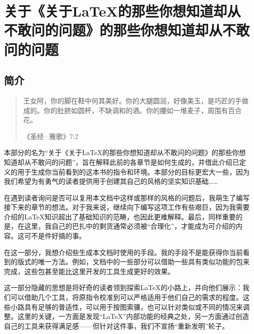 \part{关于《关于\LaTeX 的那些你想知道却从不敢问的问题》的那些你想知道却从不敢问的问题}

\chapter*{简介}

\begin{quote}
    王女阿，你的脚在鞋中何其美好。你的大腿圆润，好像美玉，是巧匠的手做成的。你的肚脐如圆杯，不缺调和的酒。你的腰如一堆麦子，周围有百合花。

    \hfill《圣经·雅歌》7:2
\end{quote}

本部分的名为“关于《关于\LaTeX 的那些你想知道却从不敢问的问题》的那些你想知道却从不敢问的问题”，旨在解释此前的各章节是如何生成的，并借此介绍已定义的用于生成你当前看到的这本书的指令和环境。本部分的目标更宏大一些，因为我们希望为有勇气的读者提供用于创建其自己的风格的坚实知识基础……

在遇到读者询问是否可以复用本文档中这样或那样的风格的问题后，我萌生了编写接下来的章节的想法。对于我来说，继续向下编写这项工作有些艰巨，因为我需要介绍的\LaTeX 知识超出了基础知识的范畴，也因此更难解释。最后，同样重要的是，在这里，我自己的巴扎中的剩货通常必须被“合理化”，才能成为可介绍的内容。这可不是件好搞的事。

在这一部分，我想介绍些生成本文档时使用的手段。我的手段不是能获得你当前看到的版式的唯一方法。例如，文档中的一些部分可以借助一些具有类似功能的包来完成，这些包甚至能比这里开发的工具生成更好的效果。

这一部分隐藏的思想是将好奇的读者领到探索\LaTeX 的小路上，并向他们展示：我们可以借助几个工具，将原指令校准到可以严格适用于他们自己的需求的程度。这些小路具有足够的普适性，可以用于按图索骥，也可以针对类似或不同的情况来调整。这里的关键，一方面是发现“\LaTeX ”内部功能的经典之处，另一方面通过创造自己的工具来获得满足感——但针对这件事，我们不宣扬“重新发明”轮子。

